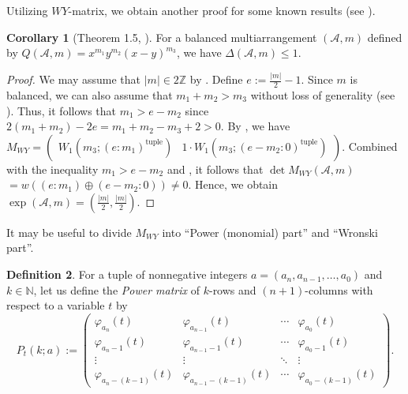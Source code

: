 \documentclass[12pt]{amsart}
\theoremstyle{definition}
\newtheorem{definition}{Definition}[section]
\newtheorem{corollary}[definition]{Corollary}
\newcommand{\NN}{\mathbb{N}}
\newcommand{\ZZ}{\mathbb{Z}}
\newcommand{\AAA}{\mathcal{A}}
\begin{document}
Utilizing $WY$-matrix, 
we obtain another proof for %
some known results 
(see ). 
%
\begin{corollary}[Theorem 1.5, \cite{Wakamiko}]%
\label{corollary:A_2 exponents}
For a balanced multiarrangement $(\AAA,m)$ defined by 
$Q(\AAA,m)=x^{m_1}y^{m_2}(x-y)^{m_3}$, we have $\Delta(\AAA,m)\leq1$. 
\end{corollary}
\begin{proof}
We may assume that $|m|\in2\ZZ$ by . 
Define $e:=\frac{|m|}{2}-1$. 
Since $m$ is balanced, we can also assume that $m_1+m_2>m_3$ without loss of generality 
(see ). 
Thus, it follows that 
$m_1>e-m_2$ since 
$2(m_1+m_2)-2e=m_1+m_2-m_3+2>0$.
By , we have 
$M_{WY}
=
\left(
\begin{array}{c|c}
 W_1(m_3;(e:m_1)^{\text{tuple}}) & 1\cdot W_1(m_3;(e-m_2:0)^{\text{tuple}})
\end{array}
\right)$. 
Combined with the inequality $m_1>e-m_2$ 
and , 
it follows that 
$\det M_{WY}(\AAA,m)$ 
$=w((e:m_1)\oplus(e-m_2:0))\neq0$. 
Hence, we obtain $\exp(\AAA,m)=(\frac{|m|}{2},\frac{|m|}{2})$. 
\end{proof}

It may be useful to divide $M_{WY}$ into ``Power (monomial) part'' and 
``Wronski part''. 

\begin{definition}
For a tuple of nonnegative integers $a=(a_n,a_{n-1},\ldots,a_0)$ and $k\in\NN$, 
let us define the \emph{Power matrix} of $k$-rows and $(n+1)$-columns 
with respect to a variable $t$ by 
\[
P_t(k;a):=
\left(
\begin{array}{cccc}
 \varphi_{a_n}(t) & \varphi_{a_{n-1}}(t) & \cdots & \varphi_{a_{0}}(t) \\
 \varphi_{a_n-1}(t) & \varphi_{a_{n-1}-1}(t) & \cdots & \varphi_{a_{0}-1}(t) \\
 \vdots & \vdots & \ddots & \vdots \\
 \varphi_{a_n-(k-1)}(t) & \varphi_{a_{n-1}-(k-1)}(t) & \cdots & \varphi_{a_{0}-(k-1)}(t) 
 \end{array}
\right).
\]
\end{definition}
\end{document}
